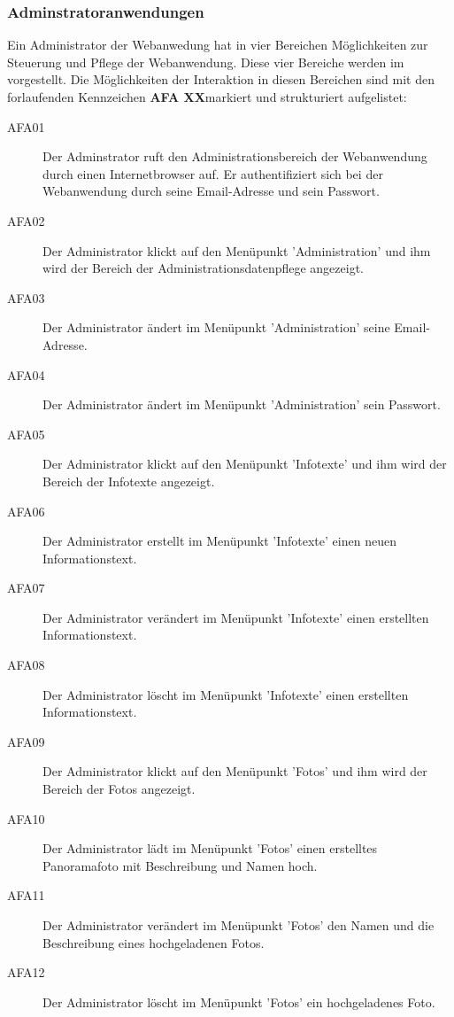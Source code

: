 \subsubsection{Adminstratoranwendungen}
\label{sec:Adminstratoranwendungen}

Ein Administrator der Webanwedung hat in vier Bereichen Möglichkeiten zur Steuerung und Pflege der Webanwendung. Diese vier Bereiche werden im  vorgestellt. Die Möglichkeiten der Interaktion in diesen Bereichen sind mit den forlaufenden Kennzeichen \textbf{AFA XX}\footnotemark markiert und strukturiert aufgelistet:


\begin{description}
  \item[AFA01] Der Adminstrator ruft den Administrationsbereich der Webanwendung durch einen Internetbrowser auf. Er authentifiziert sich bei der Webanwendung durch seine Email-Adresse und sein Passwort.
  \item[AFA02] Der Administrator klickt auf den Menüpunkt 'Administration' und ihm wird der Bereich der Administrationsdatenpflege angezeigt.
  \item[AFA03] Der Administrator ändert im Menüpunkt 'Administration' seine Email-Adresse.
  \item[AFA04] Der Administrator ändert im Menüpunkt 'Administration' sein Passwort.
  \item[AFA05] Der Administrator klickt auf den Menüpunkt 'Infotexte' und ihm wird der Bereich der Infotexte angezeigt.
  \item[AFA06] Der Administrator erstellt im Menüpunkt 'Infotexte' einen neuen Informationstext.
  \item[AFA07] Der Administrator verändert im Menüpunkt 'Infotexte' einen erstellten Informationstext.
  \item[AFA08] Der Administrator löscht im Menüpunkt 'Infotexte' einen erstellten Informationstext.
  \item[AFA09] Der Administrator klickt auf den Menüpunkt 'Fotos' und ihm wird der Bereich der Fotos angezeigt.
  \item[AFA10] Der Administrator lädt im Menüpunkt 'Fotos' einen erstelltes Panoramafoto mit Beschreibung und Namen hoch.
  \item[AFA11] Der Administrator verändert im Menüpunkt 'Fotos' den Namen und die Beschreibung eines hochgeladenen Fotos.
  \item[AFA12] Der Administrator löscht im Menüpunkt 'Fotos' ein hochgeladenes Foto.

\end{description}
